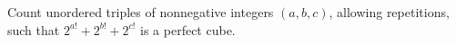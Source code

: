 Count unordered triples of nonnegative integers $(a,b,c)$, allowing repetitions, such that $2^{a!}+2^{b!}+2^{c!}$ is a perfect cube.
